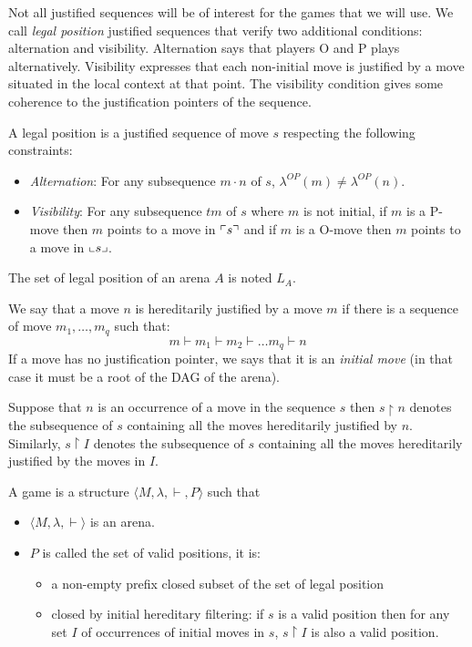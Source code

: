 Not all justified sequences will be of interest for the
games that we will use. We call \emph{legal position} justified
sequences that verify two additional conditions: alternation and
visibility. Alternation says that players O and P plays
alternatively. Visibility expresses that each non-initial move is
justified by a move situated in the local context at that point.
The visibility condition gives some coherence to the
justification pointers of the sequence.

\begin{dfn}
A legal position is a justified sequence of move $s$ respecting the following constraints:
\begin{itemize}
\item \emph{Alternation}: For any subsequence $m \cdot n$ of $s$, $\lambda^{OP}(m) \neq \lambda^{OP}(n)$.
\item \emph{Visibility}: For any subsequence $t m$ of $s$ where $m$ is not initial, if $m$ is a P-move then $m$ points to a move in $\ulcorner s \urcorner$
and if $m$ is a O-move then $m$ points to a move in $\llcorner s \lrcorner$.
\end{itemize}
The set of legal position of an arena $A$ is noted $L_A$.
\end{dfn}

We say that a move $n$ is hereditarily justified by a move $m$ if there is a sequence of move
$m_1, \ldots, m_q$ such that:
$$ m \vdash m_1 \vdash m_2 \vdash \ldots m_q \vdash n$$
If a move has no justification pointer, we says that it is an
\emph{initial move} (in that case it must be a root of the DAG of the arena).

Suppose that $n$ is an occurrence of a move in the sequence $s$ then
$s \upharpoonright n$ denotes the subsequence of $s$ containing all the moves hereditarily justified by $n$.
Similarly, $s \upharpoonright I$ denotes the
subsequence of $s$ containing all the moves hereditarily justified by the moves in $I$.

\begin{dfn}[Game]
A game is a structure $\langle M, \lambda, \vdash, P \rangle$ such that
\begin{itemize}
\item $ \langle M, \lambda, \vdash \rangle$ is an arena.
\item $P$ is called the set of valid positions, it is:
    \begin{itemize}
    \item a non-empty prefix closed subset of the set of legal position
    \item closed by initial hereditary filtering: if $s$ is a valid position then for any set $I$ of occurrences of initial moves
    in $s$, $s\upharpoonright I$ is also a valid position.
    \end{itemize}
\end{itemize}
\end{dfn}

